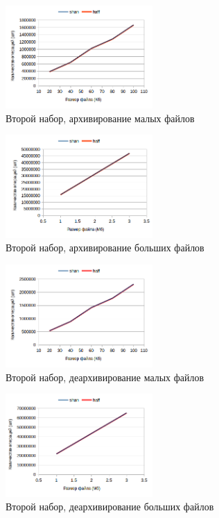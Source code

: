 \documentclass[a4paper,12pt]{article} %
\begin{document}
    \begin{figure}[!htb]
        \caption{Второй набор, архивирование малых файлов}
        \centering
        \includegraphics[width=0.5\textwidth]{graphs/2/2_c_kb}
    \end{figure}
    \begin{figure}[!htb]
        \caption{Второй набор, архивирование больших файлов}
        \centering
        \includegraphics[width=0.5\textwidth]{graphs/2/2_c_mb}
    \end{figure}
    \begin{figure}[!htb]
        \caption{Второй набор, деархивирование малых файлов}
        \centering
        \includegraphics[width=0.5\textwidth]{graphs/2/2_d_kb}
    \end{figure}
    \begin{figure}[!htb]
        \caption{Второй набор, деархивирование больших файлов}
        \centering
        \includegraphics[width=0.5\textwidth]{graphs/2/2_d_mb}
    \end{figure}
\end{document}
